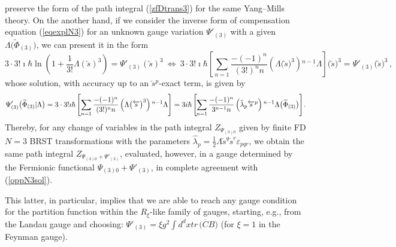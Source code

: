 \documentclass[10pt]{article}
\begin{document}
preserve the form of the path integral (\ref{zfDtrans3}) for the same Yang--Mills
theory.    On the another hand, if we consider the inverse form of compensation equation (\ref{eqexplN3})
for an unknown gauge variation $ \Psi'_{(3)}$ with a given $\Lambda\big( \widetilde{\Phi}_{(3)}\big) $,
we can present it in the form
\begin{equation}
3\cdot3!\imath\hbar\ln\left( 1+\frac{1}{3!}\Lambda(\overleftarrow{s})^3\right)
= \Psi'_{(3)}(\overleftarrow{s})^3\ \Longleftrightarrow\ 3\cdot3! \imath\hbar\left[
\sum_{n=1}\frac{-(-1)^{n}}{(3!)^{n} n}\left( \Lambda\big(\overleftarrow{s}\big)^3\right)
{}^{n-1} \Lambda\right] \big(\overleftarrow{s}\big)^3 =  \Psi'_{(3)}\big(\overleftarrow{s}\big)^3\,, \label{eqexpN3}%
\end{equation}
whose solution, with accuracy up to an $\overleftarrow{s}{}^{p}$-exact term,
is given by
\begin{equation}
\label{oppN3sol} \Psi'_{(3)}\big(\widetilde{\Phi}_{(3)}| \Lambda\big) = 3\cdot3!\imath\hbar\left[ \sum
_{n=1}\frac{-(-1)^{n}}{(3!)^{n} n}\left( \Lambda\big(\overleftarrow{s}\big)^{3}\right)
{}^{n-1} \Lambda\right]  = 3i\hbar\left[\hspace{-0.1em} \sum_{n=1}\frac{-(-1)^{n}%
}{3^{n-1} n}\left( \hat{\lambda}_{p}\overleftarrow{s}^{p}\right) {}^{n-1}
\Lambda\big(\widetilde{\Phi}_{(3)}\big)\right]\hspace{-0.1em} .
\end{equation}
Thereby, for any change of variables in the path integral $Z_{\Psi_{(3)0}}$
given by finite FD $N=3$ BRST transformations with the parameters
$\hat{\lambda}_{p} = \frac{1}{2}\Lambda \overleftarrow{s}^q\overleftarrow{s}^r \varepsilon_{pqr}$,
we obtain %
the same path integral $Z_{\Psi_{(3)0}+ \Psi'_{(3)}}$, evaluated, however,
in a gauge determined by the Fermionic functional $\Psi_{(3)0}+ \Psi'_{(3)}$,
in complete agreement with (\ref{oppN3sol}).

This latter, in particular, implies that we are able to reach any gauge condition
for the partition function within the $R_\xi$-like family of gauges, starting, e.g.,
from the Landau gauge and choosing:  $\Psi'_{(3)} =  \xi g^2 \int d^dx tr\, \big(\overline{C} B\big) $  (for $\xi=1$ in the Feynman gauge).
\end{document}
